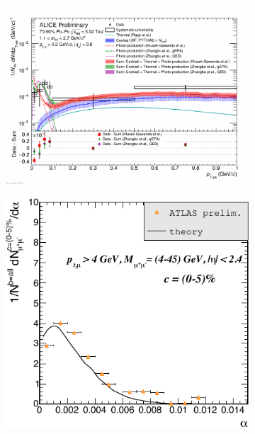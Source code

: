 \documentclass[twocolumn,epjc3]{svjour3}\sloppy
\begin{document}
\begin{figure}
    \centering
    \begin{subfigure}{.57\textwidth}
      \centering
      \includegraphics[width=.99\linewidth]{fig/fig_10-crop.pdf}
      \caption{}
    \end{subfigure}%
    \begin{subfigure}{.43\textwidth}
      \centering
      \includegraphics[width=.99\linewidth]{fig/fig_11-crop.pdf}
      \caption{}
    \end{subfigure}
 

\end{figure}
\end{document}
